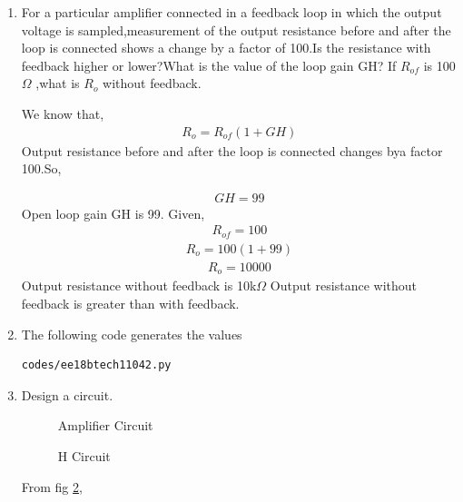 \begin{enumerate}[label=\thesubsection.\arabic*.,ref=\thesubsection.\theenumi]


\item For a particular amplifier connected in a feedback loop in which the output voltage is sampled,measurement of the output resistance before and after the loop is connected shows a change by a factor of 100.Is the resistance with feedback higher or lower?What is the value of the loop gain GH? If $R_{of}$ is 100 $\Omega$ ,what is $R_o$ without feedback.

\solution
We know that,
\begin{align}
    R_o = R_{of}(1+GH)
    \label{eq:ee18btech11042_1}
\end{align}
Output resistance before and after the loop is connected changes bya factor 100.So,

\begin{align}
    GH =99
\end{align}
Open loop gain GH is  99.
\newline
Given,
\begin{align}
    R_{of} = 100 
    \label{eq:ee18btech11042_3}
\end{align}
\begin{align}
    R_o = 100(1+99)
    \label{eq:ee18btech11042_4}
\end{align}
\begin{align}
    R_o = 10000
    \label{eq:ee18btech11042_5}
\end{align}
Output resistance without feedback  is   10k$\Omega$
\newline
Output resistance without feedback is greater than with feedback.
\item
The following code generates the values
\begin{lstlisting}
codes/ee18btech11042.py
\end{lstlisting}

\item Design a circuit.
\solution


\begin{figure}[!h]
		\resizebox{\columnwidth}{!}{}
\caption{Amplifier Circuit}
\label{fig:ee18btech11042_1}
\end{figure}
\begin{figure}[!ht]
		\resizebox{\columnwidth}{!}{}
\caption{H Circuit}
\label{fig:ee18btech11042_2}
\end{figure}
From fig \ref{fig:ee18btech11042_2},


\end{enumerate}
